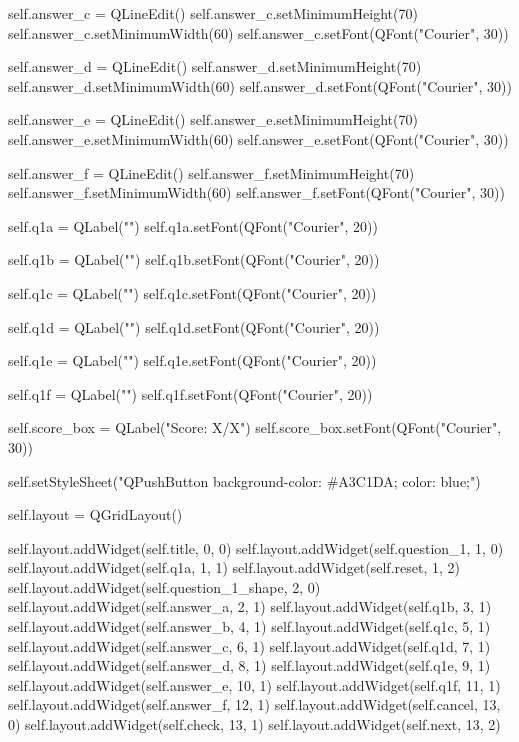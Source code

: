 \begin{python}
        self.answer_c = QLineEdit()
        self.answer_c.setMinimumHeight(70)
        self.answer_c.setMinimumWidth(60)
        self.answer_c.setFont(QFont("Courier", 30))
        
        self.answer_d = QLineEdit()
        self.answer_d.setMinimumHeight(70)
        self.answer_d.setMinimumWidth(60)
        self.answer_d.setFont(QFont("Courier", 30))
        
        self.answer_e = QLineEdit()
        self.answer_e.setMinimumHeight(70)
        self.answer_e.setMinimumWidth(60)
        self.answer_e.setFont(QFont("Courier", 30))
        
        self.answer_f = QLineEdit()
        self.answer_f.setMinimumHeight(70)
        self.answer_f.setMinimumWidth(60)
        self.answer_f.setFont(QFont("Courier", 30))

        self.q1a = QLabel("")
        self.q1a.setFont(QFont("Courier", 20))
        
        self.q1b = QLabel("")
        self.q1b.setFont(QFont("Courier", 20))
        
        self.q1c = QLabel("")
        self.q1c.setFont(QFont("Courier", 20))
        
        self.q1d = QLabel("")
        self.q1d.setFont(QFont("Courier", 20))
        
        self.q1e = QLabel("")
        self.q1e.setFont(QFont("Courier", 20))
        
        self.q1f = QLabel("")
        self.q1f.setFont(QFont("Courier", 20))
        
        self.score_box = QLabel("Score: X/X")
        self.score_box.setFont(QFont("Courier", 30))

        self.setStyleSheet("QPushButton {background-color: #A3C1DA; color: blue;}")

        self.layout = QGridLayout()

        self.layout.addWidget(self.title, 0, 0) 
        self.layout.addWidget(self.question_1, 1, 0)
        self.layout.addWidget(self.q1a, 1, 1)
        self.layout.addWidget(self.reset, 1, 2)
        self.layout.addWidget(self.question_1_shape, 2, 0)
        self.layout.addWidget(self.answer_a, 2, 1)
        self.layout.addWidget(self.q1b, 3, 1)
        self.layout.addWidget(self.answer_b, 4, 1)
        self.layout.addWidget(self.q1c, 5, 1)
        self.layout.addWidget(self.answer_c, 6, 1)
        self.layout.addWidget(self.q1d, 7, 1)
        self.layout.addWidget(self.answer_d, 8, 1)
        self.layout.addWidget(self.q1e, 9, 1)
        self.layout.addWidget(self.answer_e, 10, 1)
        self.layout.addWidget(self.q1f, 11, 1)
        self.layout.addWidget(self.answer_f, 12, 1)
        self.layout.addWidget(self.cancel, 13, 0)
        self.layout.addWidget(self.check, 13, 1)
        self.layout.addWidget(self.next, 13, 2)


\end{python}
